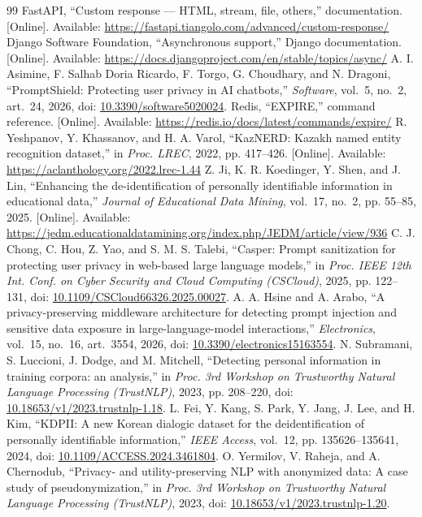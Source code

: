 \documentclass[12pt,a4paper]{article}
\newcommand{\doi}[1]{doi: \href{https://doi.org/#1}{#1}}
\begin{document}
\begin{thebibliography}{99}
 FastAPI, ``Custom response --- HTML, stream, file, others,'' documentation. [Online]. Available: \url{https://fastapi.tiangolo.com/advanced/custom-response/}
 Django Software Foundation, ``Asynchronous support,'' Django documentation. [Online]. Available: \url{https://docs.djangoproject.com/en/stable/topics/async/}
 A. I. Asimine, F. Salhab Doria Ricardo, F. Torgo, G. Choudhary, and N. Dragoni, ``PromptShield: Protecting user privacy in AI chatbots,'' \emph{Software}, vol.~5, no.~2, art.~24, 2026, \doi{10.3390/software5020024}.
 Redis, ``EXPIRE,'' command reference. [Online]. Available: \url{https://redis.io/docs/latest/commands/expire/}
 R. Yeshpanov, Y. Khassanov, and H. A. Varol, ``KazNERD: Kazakh named entity recognition dataset,'' in \emph{Proc. LREC}, 2022, pp. 417--426. [Online]. Available: \url{https://aclanthology.org/2022.lrec-1.44}
 Z. Ji, K. R. Koedinger, Y. Shen, and J. Lin, ``Enhancing the de-identification of personally identifiable information in educational data,'' \emph{Journal of Educational Data Mining}, vol.~17, no.~2, pp. 55--85, 2025. [Online]. Available: \url{https://jedm.educationaldatamining.org/index.php/JEDM/article/view/936}
 C. J. Chong, C. Hou, Z. Yao, and S. M. S. Talebi, ``Casper: Prompt sanitization for protecting user privacy in web-based large language models,'' in \emph{Proc. IEEE 12th Int. Conf. on Cyber Security and Cloud Computing (CSCloud)}, 2025, pp. 122--131, \doi{10.1109/CSCloud66326.2025.00027}.
 A. A. Hsine and A. Arabo, ``A privacy-preserving middleware architecture for detecting prompt injection and sensitive data exposure in large-language-model interactions,'' \emph{Electronics}, vol.~15, no.~16, art.~3554, 2026, \doi{10.3390/electronics15163554}.
 N. Subramani, S. Luccioni, J. Dodge, and M. Mitchell, ``Detecting personal information in training corpora: an analysis,'' in \emph{Proc. 3rd Workshop on Trustworthy Natural Language Processing (TrustNLP)}, 2023, pp. 208--220, \doi{10.18653/v1/2023.trustnlp-1.18}.
 L. Fei, Y. Kang, S. Park, Y. Jang, J. Lee, and H. Kim, ``KDPII: A new Korean dialogic dataset for the deidentification of personally identifiable information,'' \emph{IEEE Access}, vol.~12, pp. 135626--135641, 2024, \doi{10.1109/ACCESS.2024.3461804}.
 O. Yermilov, V. Raheja, and A. Chernodub, ``Privacy- and utility-preserving NLP with anonymized data: A case study of pseudonymization,'' in \emph{Proc. 3rd Workshop on Trustworthy Natural Language Processing (TrustNLP)}, 2023, \doi{10.18653/v1/2023.trustnlp-1.20}.

\end{thebibliography}
\end{document}
